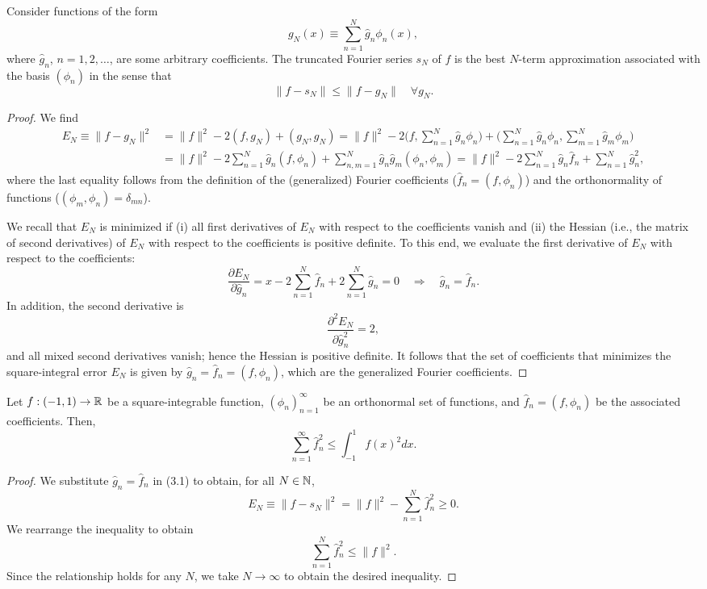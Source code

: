 \begin{proposition}
    Consider functions of the form
    \[g_N(x) \equiv \sum_{n=1}^{N} \hat{g}_n \phi_n(x),\]
    where $\hat{g}_n$, $n = 1, 2, \dots$, are some arbitrary coefficients. The truncated Fourier series $s_N$ of $f$ is the best $N$-term approximation associated with the basis $(\phi_n)$ in the sense that
    \[\|f - s_N\| \leq \|f - g_N\| \quad \forall g_N.\]
\end{proposition}
\begin{proof}
    We find
    \begin{equation*}
        \begin{aligned}
            E_N \equiv \|f - g_N\|^2 &= \|f\|^2 - 2(f, g_N) + (g_N, g_N) = \|f\|^2 - 2\Big(f, \sum_{n=1}^{N} \hat{g}_n \phi_n\Big) + \Big(\sum_{n=1}^{N} \hat{g}_n \phi_n, \sum_{m=1}^{N} \hat{g}_m \phi_m\Big) \\
            &= \|f\|^2 - 2 \sum_{n=1}^{N} \hat{g}_n (f, \phi_n) + \sum_{n,m=1}^{N} \hat{g}_n \hat{g}_m (\phi_n, \phi_m) = \|f\|^2 - 2 \sum_{n=1}^{N} \hat{g}_n \hat{f}_n + \sum_{n=1}^{N} \hat{g}_n^2,
        \end{aligned} \tag{3.1}
    \end{equation*}
    where the last equality follows from the definition of the (generalized) Fourier coefficients ($\hat{f}_n = (f, \phi_n)$) and the orthonormality of functions ($(\phi_m, \phi_n) = \delta_{mn}$).

    We recall that $E_N$ is minimized if (i) all first derivatives of $E_N$ with respect to the coefficients vanish and (ii) the Hessian (i.e., the matrix of second derivatives) of $E_N$ with respect to the coefficients is positive definite. To this end, we evaluate the first derivative of $E_N$ with respect to the coefficients:
    \[\frac{\partial E_N}{\partial \hat{g}_n} = x - 2 \sum_{n=1}^{N} \hat{f}_n + 2 \sum_{n=1}^{N} \hat{g}_n = 0 \quad \Rightarrow \quad \hat{g}_n = \hat{f}_n.\]
    In addition, the second derivative is
    \[\frac{\partial^2 E_N}{\partial \hat{g}_n^2} = 2,\]
    and all mixed second derivatives vanish; hence the Hessian is positive definite. It follows that the set of coefficients that minimizes the square-integral error $E_N$ is given by $\hat{g}_n = \hat{f}_n = (f, \phi_n)$, which are the generalized Fourier coefficients.
\end{proof}

\begin{theorem}
    Let $f : (-1, 1) \to \mathbb{R}$ be a square-integrable function, $(\phi_n)_{n=1}^{\infty}$ be an orthonormal set of functions, and $\hat{f}_n = (f, \phi_n)$ be the associated coefficients. Then,
    \[\sum_{n=1}^{\infty} \hat{f}_n^2 \leq \int_{-1}^{1} f(x)^2 dx.\]
\end{theorem}
\begin{proof}
    We substitute $\hat{g}_n = \hat{f}_n$ in (3.1) to obtain, for all $N \in \mathbb{N}$,
    \[E_N \equiv \|f - s_N\|^2 = \|f\|^2 - \sum_{n=1}^{N} \hat{f}_n^2 \geq 0.\]
    We rearrange the inequality to obtain
    \[\sum_{n=1}^{N} \hat{f}_n^2 \leq \|f\|^2.\]
    Since the relationship holds for any $N$, we take $N \to \infty$ to obtain the desired inequality.
\end{proof}

